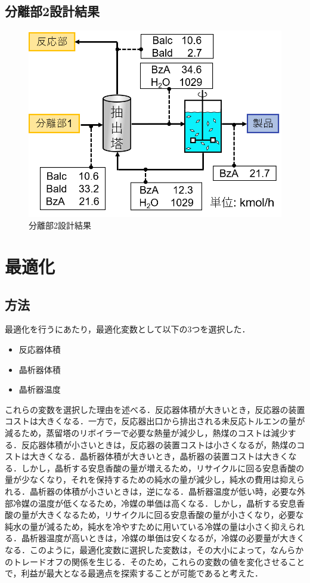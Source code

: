 \section{分離部2設計結果}
\begin{figure}[htbp]
    \label{分離部2設計結果}
    \begin{center}
        \includegraphics[scale=0.7]{Separion2Conclusion.png}
        \caption{分離部2設計結果}
    \end{center}
\end{figure}


\newpage
\chapter{最適化}
\section{方法}
最適化を行うにあたり，最適化変数として以下の3つを選択した．
\begin{itemize}
  \item 反応器体積
  \item 晶析器体積
  \item 晶析器温度
\end{itemize}

これらの変数を選択した理由を述べる．反応器体積が大きいとき，反応器の装置コストは大きくなる．一方で，反応器出口から排出される未反応トルエンの量が減るため，蒸留塔のリボイラーで必要な熱量が減少し，熱煤のコストは減少する．反応器体積が小さいときは，反応器の装置コストは小さくなるが，熱煤のコストは大きくなる．晶析器体積が大きいとき，晶析器の装置コストは大きくなる．しかし，晶析する安息香酸の量が増えるため，リサイクルに回る安息香酸の量が少なくなり，それを保持するための純水の量が減少し，純水の費用は抑えられる．晶析器の体積が小さいときは，逆になる．晶析器温度が低い時，必要な外部冷媒の温度が低くなるため，冷媒の単価は高くなる．しかし，晶析する安息香酸の量が大きくなるため，リサイクルに回る安息香酸の量が小さくなり，必要な純水の量が減るため，純水を冷やすために用いている冷媒の量は小さく抑えられる．晶析器温度が高いときは，冷媒の単価は安くなるが，冷媒の必要量が大きくなる．このように，最適化変数に選択した変数は，その大小によって，なんらかのトレードオフの関係を生じる．そのため，これらの変数の値を変化させることで，利益が最大となる最適点を探索することが可能であると考えた．

